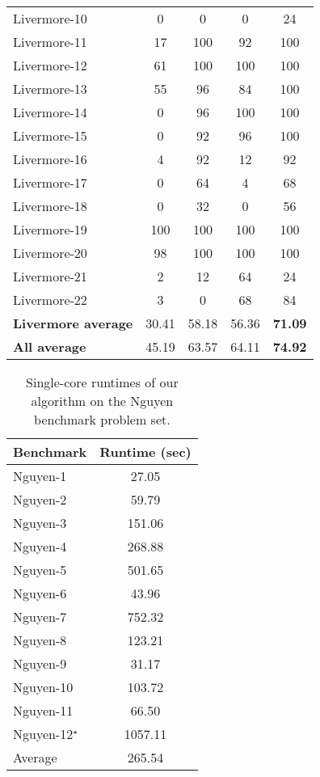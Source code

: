 \documentclass{article}
\begin{document}
\begin{table}[htbp]
\begin{tabular}{lcccc}
    Livermore-10 & 0   & 0   & 0   & 24 \\
    Livermore-11 & 17  & 100 & 92  & 100 \\
    Livermore-12 & 61  & 100 & 100 & 100 \\
    Livermore-13 & 55  & 96  & 84  & 100 \\
    Livermore-14 & 0   & 96  & 100 & 100 \\
    Livermore-15 & 0   & 92  & 96  & 100 \\
    Livermore-16 & 4   & 92  & 12  & 92 \\
    Livermore-17 & 0   & 64  & 4   & 68 \\
    Livermore-18 & 0   & 32  & 0   & 56 \\
    Livermore-19 & 100 & 100 & 100 & 100 \\
    Livermore-20 & 98  & 100 & 100 & 100 \\
    Livermore-21 & 2   & 12  & 64  & 24 \\
    Livermore-22 & 3   & 0   & 68  & 84 \\
    \midrule
    \textbf{Livermore average} & 30.41 & 58.18 & 56.36 & \textbf{71.09} \\
    \midrule
    \textbf{All average} & 45.19 & 63.57 & 64.11 & \textbf{74.92} \\
    \midrule
    \end{tabular}
  \label{tab:all_results}
\end{table}

\begin{table}[htbp]
  \centering
  \caption{Single-core runtimes of our algorithm on the Nguyen benchmark problem set.}
    \begin{tabular}{lc}
          Benchmark & Runtime (sec) \\
    \midrule
    Nguyen-1 & 27.05 \\
    Nguyen-2 & 59.79 \\
    Nguyen-3 & 151.06 \\
    Nguyen-4 & 268.88 \\
    Nguyen-5 & 501.65 \\
    Nguyen-6 & 43.96 \\
    Nguyen-7 & 752.32 \\
    Nguyen-8 & 123.21 \\
    Nguyen-9 & 31.17 \\
    Nguyen-10 & 103.72 \\
    Nguyen-11 & 66.50 \\
    Nguyen-12$^\star$ & 1057.11 \\
    \midrule
    Average & 265.54 \\
    \end{tabular}
  \label{tab:runtime}
\end{table}
\end{document}
